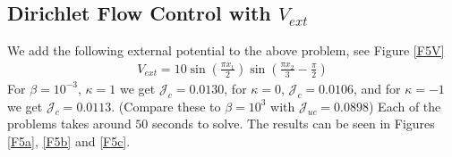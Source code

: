 \documentclass[11pt, a4paper]{article}
\theoremstyle{definition}
\begin{document}
	\subsection{Dirichlet Flow Control with $V_{ext}$}
	We add the following external potential to the above problem, see Figure \ref{F5V} 
	\begin{align*}
		V_{ext} = 10\sin\left(\frac{\pi x_1}{2}\right) \sin\left(\frac{\pi x_2}{3} - \frac{\pi}{2}\right)
	\end{align*}
	For $\beta = 10^{-3}$, $\kappa = 1$ we get $\mathcal J_c = 0.0130$, for $\kappa = 0$, $\mathcal J_c = 0.0106$, and for $\kappa = - 1$ we get $\mathcal J_c = 0.0113$. (Compare these to $\beta = 10^3$ with $\mathcal J_{uc} = 0.0898$) Each of the problems takes around $50$ seconds to solve. The results can be seen in Figures \ref{F5a}, \ref{F5b} and \ref{F5c}.
	
\end{document}
